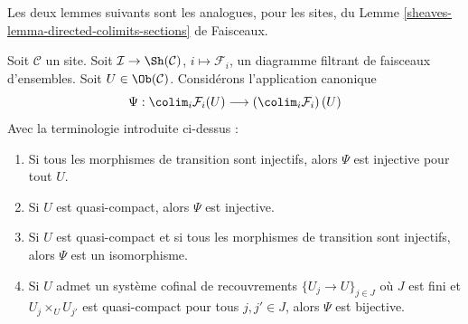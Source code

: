 \noindent
Les deux lemmes suivants sont les analogues, pour les sites, du
Lemme \ref{sheaves-lemma-directed-colimits-sections} de Faisceaux.

\begin{lemma}
\label{lemma-directed-colimits-sections}
Soit $\mathcal{C}$ un site. Soit
$\mathcal{I} \to \Sh(\mathcal{C})$, $i \mapsto \mathcal{F}_i$,
un diagramme filtrant de faisceaux d’ensembles.
Soit $U \in \Ob(\mathcal{C})$.
Considérons l’application canonique
$$
\Psi :
\colim_i \mathcal{F}_i(U)
\longrightarrow
\left(\colim_i \mathcal{F}_i\right)(U)
$$
Avec la terminologie introduite ci-dessus :
\begin{enumerate}
\item Si tous les morphismes de transition sont injectifs, alors
$\Psi$ est injective pour tout $U$.
\item Si $U$ est quasi-compact, alors $\Psi$ est injective.
\item Si $U$ est quasi-compact et si tous les morphismes de transition sont injectifs,
alors $\Psi$ est un isomorphisme.
\item Si $U$ admet un système cofinal de recouvrements
$\{U_j \to U\}_{j \in J}$ où
$J$ est fini et $U_j \times_U U_{j'}$ est quasi-compact
pour tous $j, j' \in J$, alors $\Psi$ est bijective.
\end{enumerate}
\end{lemma}

